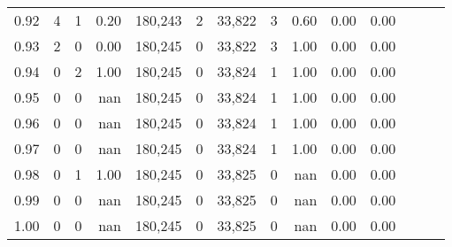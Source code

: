 \begin{tabular}{rrrrrrrrrrrrrr}
0.92 &      4 &      1 &  0.20 &  180,243 &        2 &  33,822 &       3 &  0.60 &  0.00 &      0.00 \\
0.93 &      2 &      0 &  0.00 &  180,245 &        0 &  33,822 &       3 &  1.00 &  0.00 &      0.00 \\
0.94 &      0 &      2 &  1.00 &  180,245 &        0 &  33,824 &       1 &  1.00 &  0.00 &      0.00 \\
0.95 &      0 &      0 &   nan &  180,245 &        0 &  33,824 &       1 &  1.00 &  0.00 &      0.00 \\
0.96 &      0 &      0 &   nan &  180,245 &        0 &  33,824 &       1 &  1.00 &  0.00 &      0.00 \\
0.97 &      0 &      0 &   nan &  180,245 &        0 &  33,824 &       1 &  1.00 &  0.00 &      0.00 \\
0.98 &      0 &      1 &  1.00 &  180,245 &        0 &  33,825 &       0 &   nan &  0.00 &      0.00 \\
0.99 &      0 &      0 &   nan &  180,245 &        0 &  33,825 &       0 &   nan &  0.00 &      0.00 \\
1.00 &      0 &      0 &   nan &  180,245 &        0 &  33,825 &       0 &   nan &  0.00 &      0.00 \\
\bottomrule
\end{tabular}

